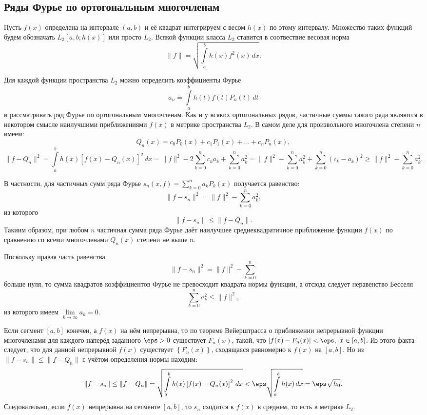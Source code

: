 \subsection{Ряды Фурье по ортогональным многочленам}
Пусть \( f(x) \) определена на интервале \( (a,b) \) и её квадрат интегрируем
с весом \( h(x) \) по этому интервалу. Множество таких функций будем обозначать
\( L_2[a,b;h(x)] \) или просто \( L_2 \). Всякой функции класса \( L_2 \)
ставится в соотвествие весовая норма
\[
    \| f \| = \sqrt{\int\limits_a^b h(x)f^2(x)\,dx}.
\]

Для каждой функции пространства \( L_2 \) можно определить коэффициенты Фурье
\[
    a_n = \int\limits_a^b h(t)f(t)P_n(t)\,dt
\]
и рассматривать ряд Фурье по ортогональным многочленам. Как и у всяких
ортогональных рядов, частичные суммы такого ряда являются в некотором смысле
наилучшими приближениями \( f(x) \) в метрике пространства \( L_2 \). В самом
деле для произвольного многочлена степени \( n \) имеем:
\[
    Q_n(x) = c_0P_0(x) + c_1P_1(x) + \ldots + c_nP_n(x),
\]
\[
    \| f - Q_n \|^2 = \int\limits_a^b h(x)\left[f(x) - Q_n(x)\right]^2\,dx =
    \| f \|^2 - 2 \sum_{k=0}^n c_ka_k + \sum_{k=0}^n a_k^2 = \| f \|^2 -
    \sum_{k=0}^n a_k^2 + \sum_{k=0}^n (c_k - a_k)^2 \ge \| f \|^2 -
    \sum_{k=0}^n a_k^2.
\]

В частности, для частичных сумм ряда Фурье
\( s_n(x, f) = \sum\limits_{k=0}^n a_k P_k(x) \) получается равенство:
\[
    \| f - s_n \|^2 = \| f \|^2 - \sum_{k=0}^n a_k^2,
\]
из которого
\[
    \| f - s_n \| \le \| f - Q_n \|.
\]
Такиим образом, при любом \( n \) частичная сумма ряда Фурье даёт наилучшее
среднеквадратичное приближение функции \( f(x) \) по сравнению со всеми
многочленами \( Q_n(x) \) степени не выше \(n\).

Поскольку правая часть равенства
\[
    \| f - s_n \|^2 = \| f \|^2 - \sum_{k=0}^n
\]
больше нуля, то сумма квадратов коэффициентов Фурье не превосходит квадрата
нормы функции, а отсюда следует неравенство Бесселя
\[
    \sum_{k=0}^n a_k^2 \le \| f \|^2,
\]
из которого имеем \( \lim\limits_{k\rightarrow\infty} a_k = 0 \).

Если сегмент \( [a,b] \) конечен, а \( f(x) \) на нём непрерывна, то по теореме
Вейерштрасса о приближении непрерывной функции многочленами для каждого наперёд
заданного \( \eps > 0 \) существует \( F_n(x) \), такой, что
\( | f(x) - F_n(x) | < \eps,\ x\in[a,b] \). Из этого факта следует, что для
данной непрерывной \( f(x) \) существует \( \left\{ F_n(x) \right\} \),
сходящаяся равномерно к \( f(x) \) на \( [a,b] \). Но из
\( \| f - s_n \| \le \| f - Q_n \| \) с учётом определения нормы находим:
\[
    \| f - s_n \| \le \| f - Q_n \| = \sqrt{\int\limits_a^b h(x)
    \left[f(x)-Q_n(x)\right]^2\,dx} < \eps\sqrt{\int\limits_a^b h(x)\,dx} =
    \eps\sqrt{h_0}.
\]
Следовательно, если \( f(x) \) непрерывна на сегменте \( [a,b] \), то \( s_n \)
сходится к \( f(x) \) в среднем, то есть в метрике \( L_2 \).

